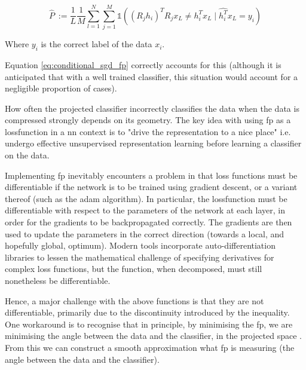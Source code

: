 \begin{equation}
\label{eq:conditional_sgd_fp}
\hat{P}\ := \frac{1}{L}\frac{1}{M}\sum_{l = 1}^N \sum_{j = 1}^M  \mathds{1}( (R_j h_i)^T R_jx_L \neq h_i^Tx_L \mid \hat{h_i^T}x_L = y_i )  
\end{equation}

Where $y_i$ is the correct label of the data $x_i$. 
\bigskip

Equation \ref{eq:conditional_sgd_fp} correctly accounts for this (although it is anticipated that with a well trained classifier, this situation would account for a negligible proportion of cases). 
\bigskip

How often the projected classifier incorrectly classifies the data when the data is compressed strongly depends on its geometry. The key idea with using \gls{fp} as a \gls{lossfunction} in a \gls{nn} context is to "drive the representation to a nice place" i.e. undergo effective unsupervised representation learning before learning a classifier on the data. 
\bigskip


Implementing  \gls{fp} inevitably encounters a problem in that loss functions must be differentiable if the network is to be trained using gradient descent, or a variant thereof (such as the \gls{adam} algorithm). In particular, the \gls{lossfunction} must be differentiable with respect to the parameters of the network at each layer, in order for the gradients to be backpropagated correctly. The gradients are then used to update the parameters in the correct direction (towards a local, and hopefully global, optimum). Modern tools incorporate auto-differentiation libraries to lessen the mathematical challenge of specifying derivatives for complex loss functions, but the function, when decomposed, must still nonetheless be differentiable.
\bigskip


Hence, a major challenge with the above functions is that they are not differentiable, primarily due to the discontinuity introduced by the inequality. One workaround is to recognise that in principle, by minimising the \gls{fp}, we are minimising the angle between the data and the classifier, in the projected space \cite[p.~3]{bob_rp_storage}. From this we can construct a smooth approximation what \gls{fp} is measuring (the angle between the data and the classifier).



